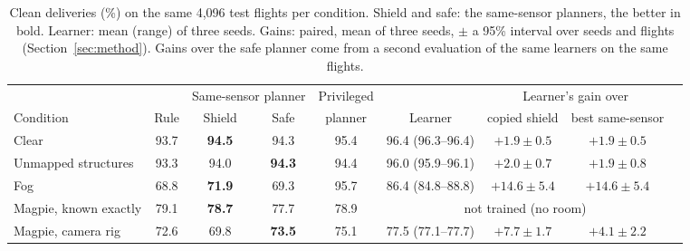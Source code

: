 \begin{table}[t]
\centering\small
\setlength{\tabcolsep}{5pt}
\caption{Clean deliveries (\%) on the same 4,096 test flights per condition. Shield and safe: the same-sensor planners, the better in bold. Learner: mean (range) of three seeds. Gains: paired, mean of three seeds, $\pm$ a 95\% interval over seeds and flights (Section~\ref{sec:method}). Gains over the safe planner come from a second evaluation of the same learners on the same flights.}
\label{tab:ladder}
\begin{tabular}{lcccccccc}
\toprule
 & & \multicolumn{2}{c}{Same-sensor planner} & Privileged & & \multicolumn{2}{c}{Learner's gain over} \\
\cmidrule(lr){3-4}\cmidrule(lr){7-8}
Condition & Rule & Shield & Safe & planner & Learner & copied shield & best same-sensor \\
\midrule
Clear & 93.7 & \textbf{94.5} & 94.3 & 95.4 & 96.4 (96.3--96.4) & $+1.9 \pm 0.5$ & $+1.9 \pm 0.5$ \\
Unmapped structures & 93.3 & 94.0 & \textbf{94.3} & 94.4 & 96.0 (95.9--96.1) & $+2.0 \pm 0.7$ & $+1.9 \pm 0.8$ \\
Fog & 68.8 & \textbf{71.9} & 69.3 & 95.7 & 86.4 (84.8--88.8) & $+14.6 \pm 5.4$ & $+14.6 \pm 5.4$ \\
Magpie, known exactly & 79.1 & \textbf{78.7} & 77.7 & 78.9 & \multicolumn{3}{c}{not trained (no room)} \\
Magpie, camera rig & 72.6 & 69.8 & \textbf{73.5} & 75.1 & 77.5 (77.1--77.7) & $+7.7 \pm 1.7$ & $+4.1 \pm 2.2$ \\
\bottomrule
\end{tabular}
\end{table}
